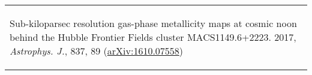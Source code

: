 \documentclass[letterpaper,10pt]{article}
\begin{document}
\begin{longtable}{p{6in}}
\begin{list}{}{\leftmargin=0.5em}
        Sub-kiloparsec resolution gas-phase metallicity maps at cosmic noon behind the Hubble Frontier Fields cluster MACS1149.6+2223. 
        2017, \textit{Astrophys. J.}, 837, 89 (\href{http://arxiv.org/abs/1610.07558}{arXiv:1610.07558})
\end{list}  \\


\end{longtable}
\end{document}
